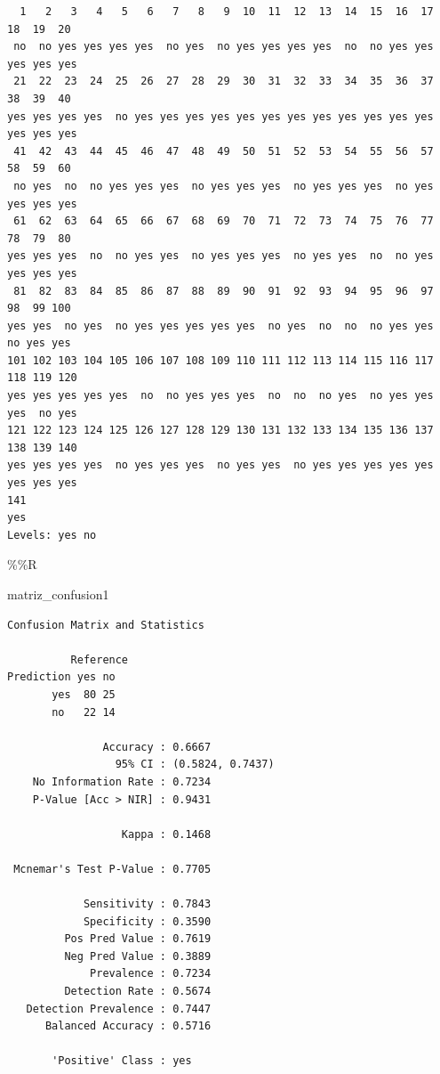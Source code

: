 \documentclass[
  11pt,
  a4paper,
]{article}
\newenvironment{Shaded}{\begin{snugshade}}{\end{snugshade}}
\newcommand{\NormalTok}[1]{#1}
\newcommand{\SpecialCharTok}[1]{\textcolor[rgb]{0.00,0.00,0.00}{#1}}
\begin{document}
\begin{verbatim}
  1   2   3   4   5   6   7   8   9  10  11  12  13  14  15  16  17  18  19  20 
 no  no yes yes yes yes  no yes  no yes yes yes yes  no  no yes yes yes yes yes 
 21  22  23  24  25  26  27  28  29  30  31  32  33  34  35  36  37  38  39  40 
yes yes yes yes  no yes yes yes yes yes yes yes yes yes yes yes yes yes yes yes 
 41  42  43  44  45  46  47  48  49  50  51  52  53  54  55  56  57  58  59  60 
 no yes  no  no yes yes yes  no yes yes yes  no yes yes yes  no yes yes yes yes 
 61  62  63  64  65  66  67  68  69  70  71  72  73  74  75  76  77  78  79  80 
yes yes yes  no  no yes yes  no yes yes yes  no yes yes  no  no yes yes yes yes 
 81  82  83  84  85  86  87  88  89  90  91  92  93  94  95  96  97  98  99 100 
yes yes  no yes  no yes yes yes yes yes  no yes  no  no  no yes yes  no yes yes 
101 102 103 104 105 106 107 108 109 110 111 112 113 114 115 116 117 118 119 120 
yes yes yes yes yes  no  no yes yes yes  no  no  no yes  no yes yes yes  no yes 
121 122 123 124 125 126 127 128 129 130 131 132 133 134 135 136 137 138 139 140 
yes yes yes yes  no yes yes yes  no yes yes  no yes yes yes yes yes yes yes yes 
141 
yes 
Levels: yes no
\end{verbatim}

\begin{Shaded}
\begin{Highlighting}[]
\SpecialCharTok{\%\%}\NormalTok{R}

\NormalTok{matriz\_confusion1}
\end{Highlighting}
\end{Shaded}

\begin{verbatim}
Confusion Matrix and Statistics

          Reference
Prediction yes no
       yes  80 25
       no   22 14
                                          
               Accuracy : 0.6667          
                 95% CI : (0.5824, 0.7437)
    No Information Rate : 0.7234          
    P-Value [Acc > NIR] : 0.9431          
                                          
                  Kappa : 0.1468          
                                          
 Mcnemar's Test P-Value : 0.7705          
                                          
            Sensitivity : 0.7843          
            Specificity : 0.3590          
         Pos Pred Value : 0.7619          
         Neg Pred Value : 0.3889          
             Prevalence : 0.7234          
         Detection Rate : 0.5674          
   Detection Prevalence : 0.7447          
      Balanced Accuracy : 0.5716          
                                          
       'Positive' Class : yes             
                                          
\end{verbatim}
\end{document}
